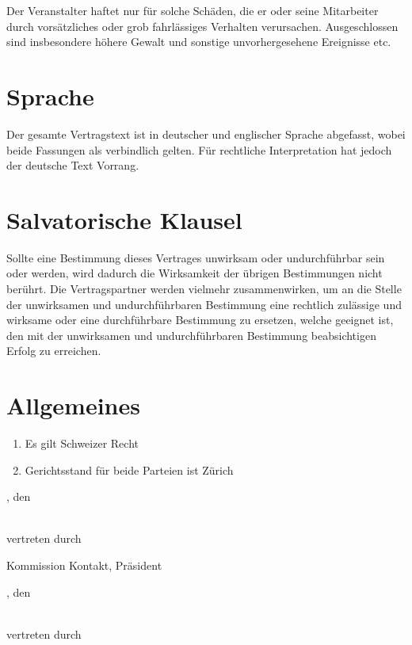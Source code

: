 Der Veranstalter haftet nur für solche Schäden, die er oder seine Mitarbeiter durch vorsätzliches oder grob fahrlässiges Verhalten verursachen. Ausgeschlossen sind insbesondere höhere Gewalt und sonstige unvorhergesehene Ereignisse etc.


\section{Sprache}

Der gesamte Vertragstext ist in deutscher und englischer Sprache abgefasst, 
wobei beide Fassungen als verbindlich gelten. Für rechtliche Interpretation hat 
jedoch der deutsche Text Vorrang.


\section{Salvatorische Klausel}

Sollte eine Bestimmung dieses Vertrages unwirksam oder undurchführbar sein oder werden, wird dadurch die Wirksamkeit der übrigen Bestimmungen nicht berührt. Die Vertragspartner werden vielmehr zusammenwirken, um an die Stelle der unwirksamen und undurchführbaren Bestimmung eine rechtlich zulässige und wirksame oder eine durchführbare Bestimmung zu ersetzen, welche geeignet ist, den mit der unwirksamen und undurchführbaren Bestimmung beabsichtigen Erfolg zu erreichen.

\section{Allgemeines}
\begin{enumerate}
\item Es gilt Schweizer Recht
\item Gerichtsstand für beide Parteien ist Zürich
\end{enumerate}

\vfill
\noindent
\begin{minipage}[t]{0.45\textwidth}
\amivcity, den \hrulefill

\bigskip\noindent
\amivname\\
vertreten durch

\vspace{4em}
\hrulefill

\amivkontaktpresident

Kommission Kontakt, Präsident
\end{minipage}%
\hspace{0.1\textwidth}
\begin{minipage}[t]{0.45\textwidth}
\makebox[8em]{\hrulefill}, den \hrulefill

\bigskip\noindent
\companyname\\
vertreten durch

\vspace{4em}
\hrulefill

\companycontact\vphantom{Ensure correct height.}\\

\end{minipage}
